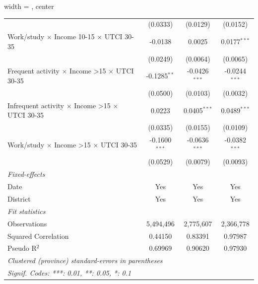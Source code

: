 \begin{table}[htbp]
\begin{adjustbox}{width = \textwidth, center}
\begin{tabular}{lccc}
                                                                         & (0.0333)                  & (0.0129)                & (0.0152)\\   
         Work/study $\times$ Income 10-15 $\times$ UTCI 30-35            & -0.0138                   & 0.0025                  & 0.0177$^{***}$\\   
                                                                         & (0.0249)                  & (0.0064)                & (0.0065)\\   
         Frequent activity $\times$ Income >15 $\times$ UTCI 30-35       & -0.1285$^{**}$            & -0.0426$^{***}$         & -0.0244$^{***}$\\   
                                                                         & (0.0500)                  & (0.0103)                & (0.0032)\\   
         Infrequent activity $\times$ Income >15 $\times$ UTCI 30-35     & 0.0223                    & 0.0405$^{***}$          & 0.0489$^{***}$\\   
                                                                         & (0.0335)                  & (0.0155)                & (0.0109)\\   
         Work/study $\times$ Income >15 $\times$ UTCI 30-35              & -0.1600$^{***}$           & -0.0636$^{***}$         & -0.0382$^{***}$\\   
                                                                         & (0.0529)                  & (0.0079)                & (0.0093)\\   
         \midrule
         \emph{Fixed-effects}\\
         Date                                                            & Yes                       & Yes                     & Yes\\  
         District                                                        & Yes                       & Yes                     & Yes\\  
         \midrule
         \emph{Fit statistics}\\
         Observations                                                    & 5,494,496                 & 2,775,607               & 2,366,778\\  
         Squared Correlation                                             & 0.44150                   & 0.83391                 & 0.97987\\  
         Pseudo R$^2$                                                    & 0.69969                   & 0.90620                 & 0.97930\\  
         \midrule \midrule
         \multicolumn{4}{l}{\emph{Clustered (province) standard-errors in parentheses}}\\
         \multicolumn{4}{l}{\emph{Signif. Codes: ***: 0.01, **: 0.05, *: 0.1}}\\
      \end{tabular}
   \end{adjustbox}
\end{table}


